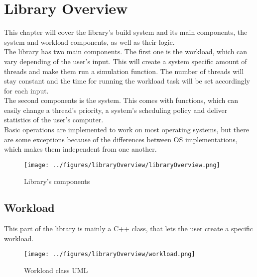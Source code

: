 \chapter{Library Overview}
This chapter will cover the library's build system and its main components, the system and workload components, as well as their logic.\\
The library has two main components. The first one is the workload, which can vary depending of the user's input. This will create a system specific amount of threads and make them run a simulation function. The number of threads will stay constant and the time for running the workload task will be set accordingly for each input.\\
The second components is the system. This comes with functions, which can easily change a thread's priority, a system's scheduling policy and deliver statistics of the user's computer.\\
Basic operations are implemented to work on most operating systems, but there are some exceptions because of the differences between OS implementations, which makes them independent from one another.
\begin{figure}[!htb]
	\centering
	\texttt{[image: ../figures/libraryOverview/libraryOverview.png]}
	\caption{Library's components}
\end{figure}
\newpage
\section{Workload}
This part of the library is mainly a C++ class, that lets the user create a specific workload.
\begin{figure}[!htb]
	\centering
	\texttt{[image: ../figures/libraryOverview/workload.png]}
	\caption{Workload class UML}
\end{figure}
